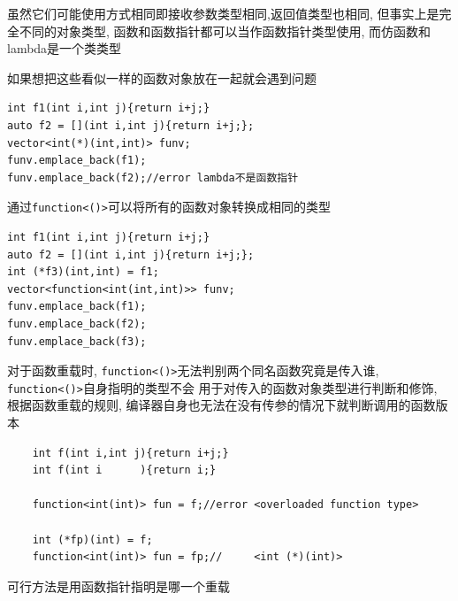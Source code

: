 虽然它们可能使用方式相同即接收参数类型相同,返回值类型也相同, 但事实上是完全不同的对象类型, 
	函数和函数指针都可以当作函数指针类型使用, 而仿函数和lambda是一个类类型

如果想把这些看似一样的函数对象放在一起就会遇到问题
\begin{lstlisting}
int f1(int i,int j){return i+j;}
auto f2 = [](int i,int j){return i+j;};
vector<int(*)(int,int)> funv;
funv.emplace_back(f1);
funv.emplace_back(f2);//error lambda不是函数指针
\end{lstlisting}

通过{\tt function<()>}可以将所有的函数对象转换成相同的类型
\begin{lstlisting}
int f1(int i,int j){return i+j;}
auto f2 = [](int i,int j){return i+j;};
int (*f3)(int,int) = f1;
vector<function<int(int,int)>> funv;
funv.emplace_back(f1);
funv.emplace_back(f2);
funv.emplace_back(f3);
\end{lstlisting}

对于函数重载时, {\tt function<()>}无法判别两个同名函数究竟是传入谁, {\tt function<()>}自身指明的类型不会
	用于对传入的函数对象类型进行判断和修饰, 根据函数重载的规则, 编译器自身也无法在没有传参的情况下就判断调用的函数版本
\begin{lstlisting}
	int f(int i,int j){return i+j;}
	int f(int i      ){return i;}
	
	function<int(int)> fun = f;//error <overloaded function type>

	int (*fp)(int) = f;
	function<int(int)> fun = fp;//     <int (*)(int)>
\end{lstlisting}

可行方法是用函数指针指明是哪一个重载

